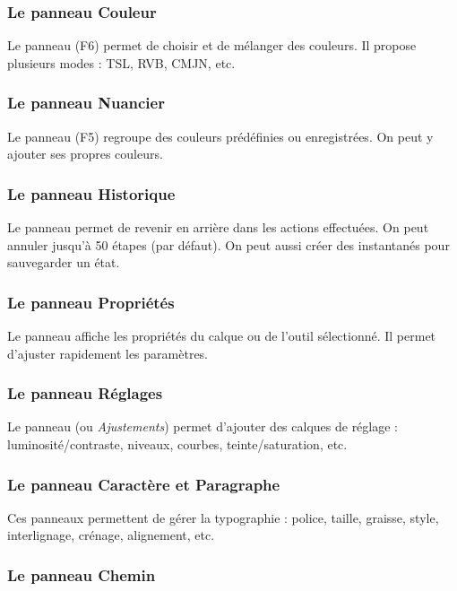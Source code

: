 \subsubsection{Le panneau Couleur}

Le panneau  (F6) permet de choisir et de mélanger des couleurs. Il propose plusieurs modes : TSL, RVB, CMJN, etc.

\subsubsection{Le panneau Nuancier}

Le panneau  (F5) regroupe des couleurs prédéfinies ou enregistrées. On peut y ajouter ses propres couleurs.

\subsubsection{Le panneau Historique}

Le panneau  permet de revenir en arrière dans les actions effectuées. On peut annuler jusqu'à 50 étapes (par défaut). On peut aussi créer des instantanés pour sauvegarder un état.

\subsubsection{Le panneau Propriétés}

Le panneau  affiche les propriétés du calque ou de l'outil sélectionné. Il permet d'ajuster rapidement les paramètres.

\subsubsection{Le panneau Réglages}

Le panneau  (ou \emph{Ajustements}) permet d'ajouter des calques de réglage : luminosité/contraste, niveaux, courbes, teinte/saturation, etc.

\subsubsection{Le panneau Caractère et Paragraphe}

Ces panneaux permettent de gérer la typographie : police, taille, graisse, style, interlignage, crénage, alignement, etc.

\subsubsection{Le panneau Chemin}

